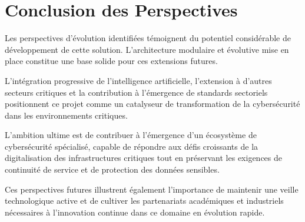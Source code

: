 \section{Conclusion des Perspectives}

Les perspectives d'évolution identifiées témoignent du potentiel considérable de développement de cette solution. L'architecture modulaire et évolutive mise en place constitue une base solide pour ces extensions futures.

L'intégration progressive de l'intelligence artificielle, l'extension à d'autres secteurs critiques et la contribution à l'émergence de standards sectoriels positionnent ce projet comme un catalyseur de transformation de la cybersécurité dans les environnements critiques.

L'ambition ultime est de contribuer à l'émergence d'un écosystème de cybersécurité spécialisé, capable de répondre aux défis croissants de la digitalisation des infrastructures critiques tout en préservant les exigences de continuité de service et de protection des données sensibles.

Ces perspectives futures illustrent également l'importance de maintenir une veille technologique active et de cultiver les partenariats académiques et industriels nécessaires à l'innovation continue dans ce domaine en évolution rapide.

\newpage
